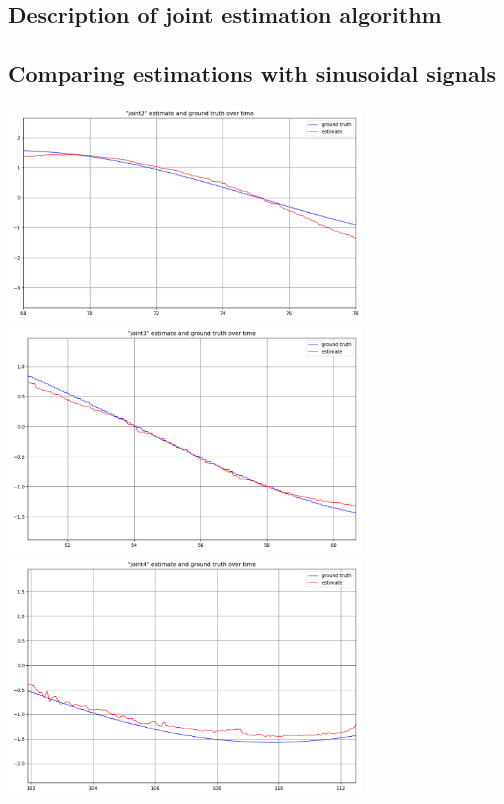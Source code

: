 
\subsection{Description of joint estimation algorithm}


\subsection{Comparing estimations with sinusoidal signals}
\begin{center}
    \includegraphics[width=0.7\textwidth]{plots/q2_1_j2_10sec.png}
    \includegraphics[width=0.7\textwidth]{plots/q2_1_j3_10sec.png}
    \includegraphics[width=0.7\textwidth]{plots/q2_1_j4_10sec.png}
\end{center}

